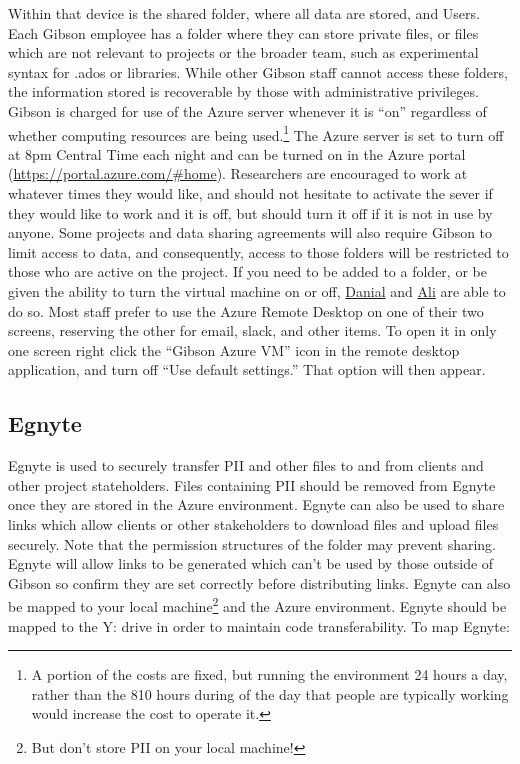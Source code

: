{Within that device is the shared folder, where all data are stored, and Users. Each Gibson employee has a folder where they can store private files, or files which are not relevant to projects or the broader team, such as experimental syntax for .ados or libraries. While other Gibson staff cannot access these folders, the information stored is recoverable by those with administrative privileges. \\



Gibson is charged for use of the Azure server whenever it is ``on'' regardless of whether computing resources are being used.\footnote{A portion of the costs are fixed, but running the environment 24 hours a day, rather than the 8\textendash{}10 hours during of the day that people are typically working would increase the cost to operate it.} The Azure server is set to turn off at 8pm Central Time each night and can be turned on in the Azure portal (\href{https://portal.azure.com/\#home}{https://portal.azure.com/\#home}). Researchers are encouraged to work at whatever times they would like, and should not hesitate to activate the sever if they would like to work and it is off, but should turn it off if it is not in use by anyone. Some projects and data sharing agreements will also require Gibson to limit access to data, and consequently, access to those folders will be restricted to those who are active on the project. If you need to be added to a folder, or be given the ability to turn the virtual machine on or off,  \href{mailto:dhoepfner@gibsonconsult.com}{Danial} and \href{mailto:ataylan@gibsonconsult.com}{Ali} are able to do so. Most staff prefer to use the Azure Remote Desktop on one of their two screens, reserving the other for email, slack, and other items. To open it in only one screen right click the ``Gibson Azure VM'' icon in the remote desktop application, and turn off ``Use default settings.'' That option will then appear. \\


\subsection{Egnyte}
Egnyte is used to securely transfer PII and other files to and from clients and other project stateholders. Files containing PII should be removed from Egnyte once they are stored in the Azure environment. Egnyte can also be used to share links which allow clients or other stakeholders to download files and upload files securely. Note that the permission structures of the folder may prevent sharing. Egnyte will allow links to be generated which can't be used by those outside of Gibson so confirm they are set correctly before distributing links. Egnyte can also be mapped to your local machine\footnote{But don't store PII on your local machine!} and the Azure environment. Egnyte should be mapped to the Y: drive in order to maintain code transferability. To map Egnyte:

}

